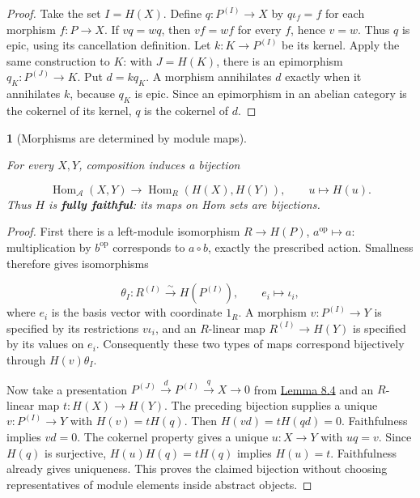 \documentclass[11pt,a4paper]{article}
\newcommand{\mathheading}{}
\theoremstyle{plain}
\newtheorem*{plainstatement}{\mathheading}
\theoremstyle{definition}
\newenvironment{mathstatement}[3]{\renewcommand{\mathheading}{#1 #2}\begin{plainstatement}[#3]}{\end{plainstatement}}
\begin{document}
\begin{proof}

Take the set \(I=H(X)\). Define \(q:P^{(I)}\to X\) by \(q\iota_f=f\) for each morphism \(f:P\to X\). If \(vq=wq\), then \(vf=wf\) for every \(f\), hence \(v=w\). Thus \(q\) is epic, using its cancellation definition. Let \(k:K\to P^{(I)}\) be its kernel. Apply the same construction to \(K\): with \(J=H(K)\), there is an epimorphism \(q_K:P^{(J)}\to K\). Put \(d=kq_K\). A morphism annihilates \(d\) exactly when it annihilates \(k\), because \(q_K\) is epic. Since an epimorphism in an abelian category is the cokernel of its kernel, \(q\) is the cokernel of \(d\).


\end{proof}
 
\begin{mathstatement}{Lemma}{8.5}{Morphisms are determined by module maps}
\label{env-8-5}

For every \(X,Y\), composition induces a bijection

 \[\operatorname{Hom}_{\mathcal A}(X,Y)\longrightarrow\operatorname{Hom}_R(H(X),H(Y)),\qquad u\longmapsto H(u).\] 
Thus \(H\) is \textbf{fully faithful}: its maps on Hom sets are bijections.


\par{}\par

\end{mathstatement}
 
\begin{proof}

First there is a left-module isomorphism \(R\to H(P)\), \(a^{\mathrm{op}}\mapsto a\): multiplication by \(b^{\mathrm{op}}\) corresponds to \(a\circ b\), exactly the prescribed action. Smallness therefore gives isomorphisms

 \[\theta_I:R^{(I)}\xrightarrow{\sim}H(P^{(I)}),\qquad e_i\longmapsto\iota_i,\] 
where \(e_i\) is the basis vector with coordinate \(1_R\). A morphism \(v:P^{(I)}\to Y\) is specified by its restrictions \(v\iota_i\), and an \(R\)-linear map \(R^{(I)}\to H(Y)\) is specified by its values on \(e_i\). Consequently these two types of maps correspond bijectively through \(H(v)\theta_I\).

 
Now take a presentation \(P^{(J)}\xrightarrow dP^{(I)}\xrightarrow qX\to0\) from \hyperref[env-8-4]{Lemma 8.4} and an \(R\)-linear map \(t:H(X)\to H(Y)\). The preceding bijection supplies a unique \(v:P^{(I)}\to Y\) with \(H(v)=tH(q)\). Then \(H(vd)=tH(qd)=0\). Faithfulness implies \(vd=0\). The cokernel property gives a unique \(u:X\to Y\) with \(uq=v\). Since \(H(q)\) is surjective, \(H(u)H(q)=tH(q)\) implies \(H(u)=t\). Faithfulness already gives uniqueness. This proves the claimed bijection without choosing representatives of module elements inside abstract objects.


\end{proof}
 
\end{document}
